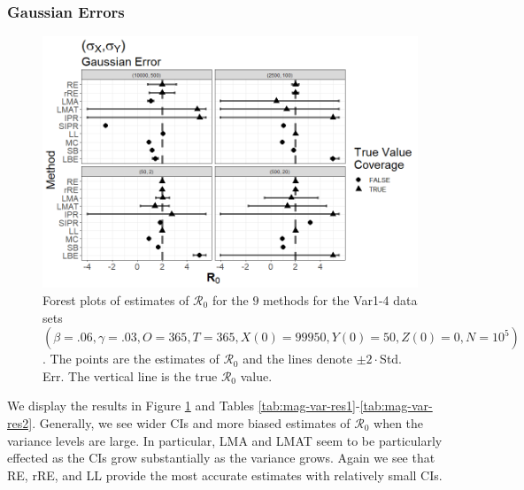 \documentclass[12pt]{article}
\newcommand{\xxsir}{\ensuremath{9} } %
\newcommand{\rr}{\ensuremath{\mathcal{R}_0}}
\begin{document}
\subsubsection{Gaussian Errors}

\begin{figure}[H]
\begin{center}
  \includegraphics[scale=0.5]{images/var_n.tiff}
  \caption{Forest plots of estimates of $\rr$ for the \xxsir methods for the Var1-4 data sets $(\beta=.06, \gamma=.03, O=365, T=365, X(0)=99950, Y(0)=50, Z(0)=0, N=10^5)$.  The points are the estimates of $\rr$ and the lines denote $\pm 2\cdot $Std. Err.  The vertical line is the true $\rr$ value.}
  \label{fig:mag-var-res}
\end{center}
\end{figure}

We display the results in Figure \ref{fig:mag-var-res} and Tables \ref{tab:mag-var-res1}-\ref{tab:mag-var-res2}.  Generally, we see wider CIs and more biased estimates of $\rr$ when the variance levels are large.  In particular, LMA and LMAT seem to be particularly effected as the CIs grow substantially as the variance grows.  Again we see that RE, rRE, and LL provide the most accurate estimates with relatively small CIs.
\end{document}
